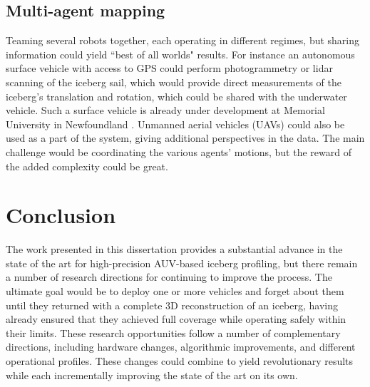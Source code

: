 \subsection{Multi-agent mapping}
Teaming several robots together, each operating in different regimes, but sharing information could yield ``best of all worlds" results. For instance an autonomous surface vehicle with access to GPS could perform photogrammetry or lidar scanning of the iceberg sail, which would provide direct measurements of the iceberg's translation and rotation, which could be shared with the underwater vehicle. Such a surface vehicle is already under development at Memorial University in Newfoundland \cite{Smith2014}. Unmanned aerial vehicles (UAVs) could also be used as a part of the system, giving additional perspectives in the data. The main challenge would be coordinating the various agents' motions, but the reward of the added complexity could be great. 

\section{Conclusion}

The work presented in this dissertation provides a substantial advance in the state of the art for high-precision AUV-based iceberg profiling, but there remain a number of research directions for continuing to improve the process. The ultimate goal would be to deploy one or more vehicles and forget about them until they returned with a complete 3D reconstruction of an iceberg, having already ensured that they achieved full coverage while operating safely within their limits. These research opportunities follow a number of complementary directions, including hardware changes, algorithmic improvements, and different operational profiles. These changes could combine to yield revolutionary results while each incrementally improving the state of the art on its own. 